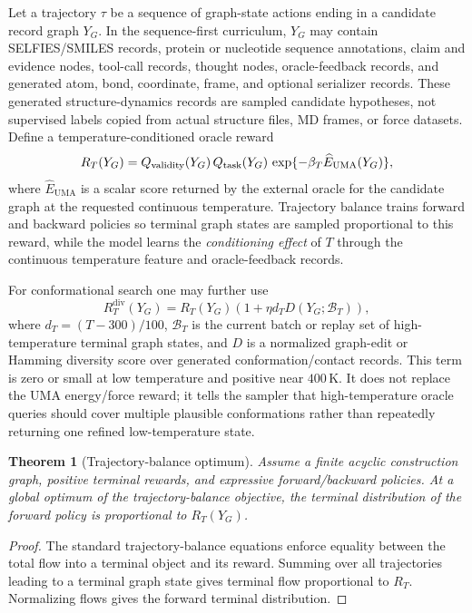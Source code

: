 \documentclass[11pt]{article}
\newtheorem{theorem}[definition]{Theorem}
\newcommand{\1}{\mathbf{1}}
\begin{document}
Let a trajectory $\tau$ be a sequence of graph-state actions ending in a candidate record graph \(Y_G\). In the sequence-first curriculum, \(Y_G\) may contain SELFIES/SMILES records, protein or nucleotide sequence annotations, claim and evidence nodes, tool-call records, thought nodes, oracle-feedback records, and generated atom, bond, coordinate, frame, and optional serializer records. These generated structure-dynamics records are sampled candidate hypotheses, not supervised labels copied from actual structure files, MD frames, or force datasets. Define a temperature-conditioned oracle reward
\[
R_T(Y_G)=Q_{\rm validity}(Y_G)\,Q_{\rm task}(Y_G)\,
\exp\{-\beta_T \widehat E_{\mathrm{UMA}}(Y_G)\},
\]
where \(\widehat E_{\mathrm{UMA}}\) is a scalar score returned by the external oracle for the candidate graph at the requested continuous temperature. Trajectory balance trains forward and backward policies so terminal graph states are sampled proportional to this reward, while the model learns the \emph{conditioning effect} of \(T\) through the continuous temperature feature and oracle-feedback records.

For conformational search one may further use
\[
  R_T^{\mathrm{div}}(Y_G)=R_T(Y_G)\left(1+\eta d_T D(Y_G;\mathcal B_T)\right),
\]
where \(d_T=(T-300)/100\), \(\mathcal B_T\) is the current batch or replay set of high-temperature terminal graph states, and \(D\) is a normalized graph-edit or Hamming diversity score over generated conformation/contact records. This term is zero or small at low temperature and positive near \(400\,\mathrm K\). It does not replace the UMA energy/force reward; it tells the sampler that high-temperature oracle queries should cover multiple plausible conformations rather than repeatedly returning one refined low-temperature state.

\begin{theorem}[Trajectory-balance optimum]
Assume a finite acyclic construction graph, positive terminal rewards, and expressive forward/backward policies. At a global optimum of the trajectory-balance objective, the terminal distribution of the forward policy is proportional to \(R_T(Y_G)\).
\end{theorem}
\begin{proof}
The standard trajectory-balance equations enforce equality between the total flow into a terminal object and its reward. Summing over all trajectories leading to a terminal graph state gives terminal flow proportional to \(R_T\). Normalizing flows gives the forward terminal distribution.\end{proof}
\end{document}

